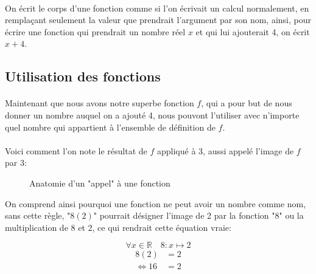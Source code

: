 \documentclass[a4paper]{book}
\begin{document}
    \paragraph{}
    On écrit le corps d'une fonction comme si l'on écrivait un calcul normalement, en remplaçant seulement la valeur que prendrait l'argument par son nom, ainsi, pour écrire une fonction qui prendrait un nombre réel $x$ et qui lui ajouterait 4, on écrit $x + 4$.
    
    \subsection{Utilisation des fonctions}
    \paragraph{}
    Maintenant que nous avons notre superbe fonction $f$, qui a pour but de nous donner un nombre auquel on a ajouté 4, nous pouvont l'utiliser avec n'importe quel nombre qui appartient à l'ensemble de définition de $f$. 
    \paragraph{}
    Voici comment l'on note le résultat de $f$ appliqué à 3, aussi appelé l'image de $f$ par 3:
          \begin{figure}[h]
        \centering
        \caption{Anatomie d'un "appel" à une fonction}
        \label{fig:function_call_anatomy}
    \end{figure}
    
    On comprend ainsi pourquoi une fonction ne peut avoir un nombre comme nom, sans cette règle, "$8(2)$" pourrait désigner l'image de 2 par la fonction "8" ou la multiplication de 8 et 2, ce qui rendrait cette équation vraie:
    
    $$\forall x \in \mathds{R}\quad 8:x\mapsto 2$$
    \begin{equation*}
        \begin{split}
        8(2) &= 2 \\
        \iff 16 &= 2
        \end{split}
    \end{equation*}
    
\end{document}
